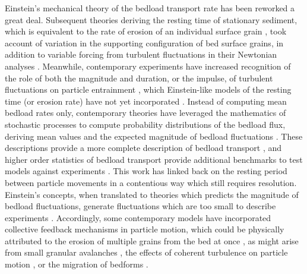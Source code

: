 \documentclass{article}
\begin{document}
Einstein's mechanical theory of the bedload transport rate \citep{Einstein1950} has been reworked a great deal. 
Subsequent theories deriving the resting time of stationary sediment, which is equivalent to the rate of erosion of an individual surface grain \citep{Yalin1972}, took account of variation in the supporting configuration of bed surface grains, in addition to variable forcing from turbulent fluctuations in their Newtonian analyses \citep{Paintal1971, Wu2002, Dey2018}.
Meanwhile, contemporary experiments have increased recognition of the role of both the magnitude and duration, or the impulse, of turbulent fluctuations on particle entrainment \citep{Diplas2008, Valyrakis2010, Celik2014}, which Einstein-like models of the resting time (or erosion rate) have not yet incorporated \citep{Dey2018}. 
Instead of computing mean bedload rates only, contemporary theories have leveraged the mathematics of stochastic processes to compute probability distributions of the bedload flux, deriving mean values and the expected magnitude of bedload fluctuations \citep{Sun2000, Ancey2006, Ancey2008}. 
These descriptions provide a more complete description of bedload transport \citep{Ancey2008}, and higher order statistics of bedload transport provide additional benchmarks to test models against experiments \citep{Iverson2013}. 
This work has linked back on the resting period between particle movements in a contentious way which still requires resolution. 
Einstein's concepts, when translated to theories which predicts the magnitude of bedload fluctuations, generate fluctuations which are too small to describe experiments \citep{Ancey2006}. 
Accordingly, some contemporary models have incorporated collective feedback mechanisms in particle motion, which could be physically attributed to the erosion of multiple grains from the bed at once \citep{Ancey2008, Heyman2013, Ma2014}, as might arise from small granular avalanches \citep{Heyman2013}, the effects of coherent turbulence on particle motion \citep{Nino1998, Amir2014, Santos2014, Shih2017}, or the migration of bedforms \citep{Dhont2018}. 
\end{document}
